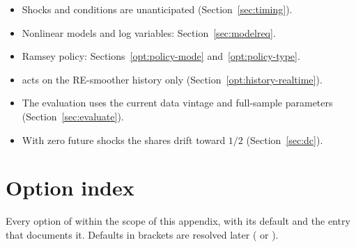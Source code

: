 \documentclass[11pt,a4paper]{article}
\begin{document}
\begin{itemize}[nosep]
  \item Shocks and conditions are unanticipated (Section~\ref{sec:timing}).
  \item Nonlinear models and log variables: Section~\ref{sec:modelreq}.
  \item Ramsey policy: Sections~\ref{opt:policy-mode} and~\ref{opt:policy-type}.
  \item {} acts on the RE-smoother history only
        (Section~\ref{opt:history-realtime}).
  \item The evaluation uses the current data vintage and full-sample parameters
        (Section~\ref{sec:evaluate}).
  \item With zero future shocks the shares drift toward $1/2$ (Section~\ref{sec:dc}).
\end{itemize}

\appendix
\section{Option index}\label{app:index}

Every option of  within the scope of this appendix, with its default and
the entry that documents it. Defaults in brackets are resolved later (\code{[]} or ).
\end{document}
